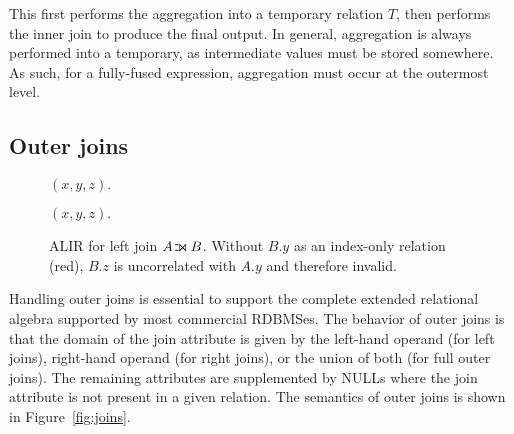 \documentclass[acmsmall,screen,nonacm]{acmart}\settopmatter{printfolios=true,printccs=false,printacmref=false}
\newcommand*{\ojoinbars}{\rule[0.05ex]{.25em}{.6pt}\llap{\rule[1.0ex]{.25em}{.6pt}}}
\DeclareMathOperator*{\ljoin}{\ojoinbars\mkern-6.8mu\Join}
\DeclareMathOperator*{\ojoin}{\ojoinbars\mkern-6.8mu\Join\mkern-6.8mu\ojoinbars}
\newcommand*{\NULL}{\textsf{NULL}}
\begin{document}
This first performs the aggregation into a temporary relation $T$, then
performs the inner join to produce the final output. In general, aggregation is
always performed into a temporary, as intermediate values must be stored somewhere.
As such, for a fully-fused expression,
aggregation must occur at the outermost level.

\subsection{Outer joins}
\label{subsec:outer-joins}
\begin{figure}
    \begin{minipage}[t]{0.38\textwidth}
        \begin{algorithmic}\footnotesize
                        \State $(x, y, z).$
                    \EndALIRFor
                \EndALIRFor
            \EndALIRFor
        \end{algorithmic}
        \vspace{-1em}
        \caption{ALIR for the outer join $A \ojoin B$. $\cup \, \varnothing$ indicates
        loops that produce \NULL{} values.}
        \label{fig:alir-full-outer}
        \vspace{-1em}
    \end{minipage}
    \hfill
    \begin{minipage}[t]{0.58\textwidth}
        \begin{algorithmic}\footnotesize
                        \State $(x, y, z).$
                    \EndALIRFor
                \EndALIRFor
            \EndALIRFor
        \end{algorithmic}
        \vspace{-1em}
        \caption{ALIR for left join $A \ljoin B$. Without $B.y$ as an index-only relation (red), $B.z$ is uncorrelated with $A.y$ and therefore invalid.
        }
        \label{fig:alir-left-join-incorrect}
        \vspace{-1em}
    \end{minipage}
\end{figure}

Handling outer joins is essential to support the complete extended relational algebra
supported by most commercial RDBMSes. The behavior of outer joins is that the domain of the join
attribute is given by the left-hand operand (for left joins),
right-hand operand (for right joins), or the union of both (for full
outer joins). The remaining attributes are supplemented by \NULL{}s
where the join attribute is not present in a given relation.
The semantics of outer joins is shown in Figure~\ref{fig:joins}.
\end{document}
